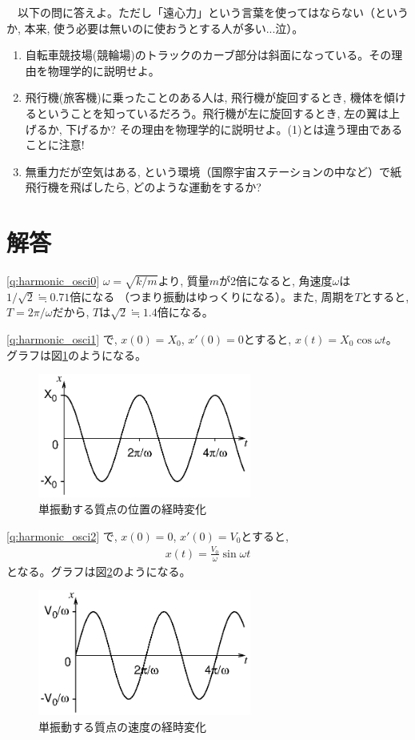 \begin{exq}　以下の問に答えよ。ただし「遠心力」という言葉を使ってはならない（というか, 本来, 使う必要は無いのに使おうとする人が多い...泣）。
\begin{enumerate}
\item 自転車競技場(競輪場)のトラックのカーブ部分は斜面になっている。その理由を物理学的に説明せよ。
\item 飛行機(旅客機)に乗ったことのある人は, 飛行機が旋回するとき, 機体を傾けるということを知っているだろう。飛行機が左に旋回するとき, 左の翼は上げるか, 下げるか? その理由を物理学的に説明せよ。(1)とは違う理由であることに注意!
\item 無重力だが空気はある, という環境（国際宇宙ステーションの中など）で紙飛行機を飛ばしたら, どのような運動をするか?
\end{enumerate}
\end{exq}



\section{解答}
%
\ref{q:harmonic_osci0}
$\omega=\sqrt{k/m}$より, 質量$m$が2倍になると, 角速度$\omega$は$1/\sqrt{2}\fallingdotseq0.71$倍になる
（つまり振動はゆっくりになる）。また, 周期を$T$とすると, $T=2\pi/\omega$だから, $T$は$\sqrt{2}\fallingdotseq1.4$倍になる。\mv

%
\ref{q:harmonic_osci1}
で, $x(0)=X_0$, $x'(0)=0$とすると, $x(t)=X_0\cos\omega t$。
グラフは図\ref{fig:springX0}のようになる。
\begin{figure}[h]
    \centering
    \includegraphics[width=7cm]{springX0.eps}
    \caption{単振動する質点の位置の経時変化}\label{fig:springX0}
\end{figure}

%
\ref{q:harmonic_osci2}
で, $x(0)=0$, $x'(0)=V_0$とすると, 
\begin{eqnarray}x(t)=\frac{V_0}{\omega}\sin\omega t\end{eqnarray}
となる。グラフは図\ref{fig:springV0}のようになる。\mv
\begin{figure}[h]
    \centering
    \includegraphics[width=7cm]{springV0.eps}
    \caption{単振動する質点の速度の経時変化}\label{fig:springV0}
\end{figure}

